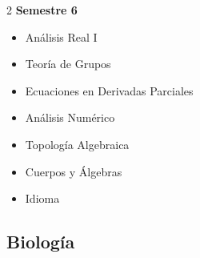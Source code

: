 \documentclass[12pt,a4paper]{article}
\begin{document}
\begin{multicols}{2}
		\textbf{Semestre 6}
		\begin{itemize}
			\item Análisis Real I
			\item Teoría de Grupos
			\item Ecuaciones en Derivadas Parciales
			\item Análisis Numérico
			\item Topología Algebraica
			\item Cuerpos y Álgebras
			\item Idioma
		\end{itemize}
	\end{multicols}
	
	\newpage
	
	\subsection{Biología}
	
\end{document}

